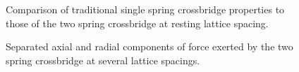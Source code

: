 \documentclass[]{article}
\begin{document}
\begin{figure}[p]
    \begin{center}
    \label{fig:1s}
    \caption{
        Comparison of traditional single spring crossbridge properties to those of the two spring crossbridge at resting lattice spacing.}
    \end{center}
\end{figure}

\begin{figure}[p]
    \begin{center}
    \label{fig:force_components}
    \caption{
        Separated axial and radial components of force exerted by the two spring crossbridge at several lattice spacings.}
    \end{center}
\end{figure}






\end{document}
